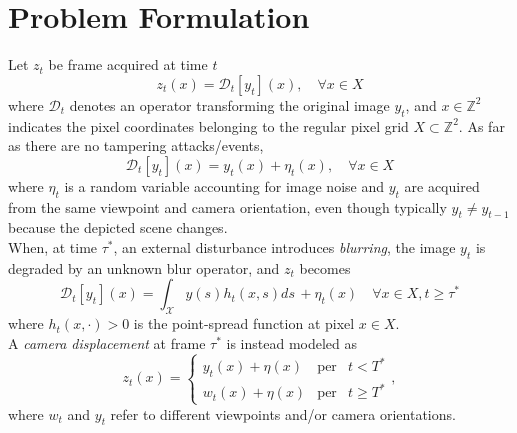 \documentclass{llncs}
\begin{document}

% 
%
%
%
\section{Problem Formulation}\label{sec:probForm}
%
Let $z_t$ be frame acquired at time $t$
\begin{equation}
\label{eq:observationModel}
z_t(x)=\mathcal{D}_t[y_t](x), \quad \forall x \in X
\end{equation}
where $\mathcal{D}_t$ denotes an operator transforming the original image $y_t$, and $x\in \mathbb{Z}^2$ indicates the pixel coordinates belonging to the regular pixel grid $X \subset \mathbb{Z}^2$. As far as there are no tampering attacks/events,
\begin{equation}
\label{eq:no_tampering}
\mathcal{D}_t[y_t](x) = y_t(x) + \eta_t(x), \quad \forall x \in X
\end{equation}
where $\eta_t$ is a random variable accounting for image noise and $y_t$ are acquired from the same viewpoint and camera orientation, even though typically $y_t \neq y_{t-1}$ because the depicted scene changes.\\
When, at time $\tau^*$, an external disturbance introduces \emph{blurring}, the image $y_t$ is degraded by an unknown blur operator, and $z_t$ becomes
\begin{equation}
\label{eq:model_defocus}
\mathcal{D}_t[y_t](x) = \int_{\mathcal{X}}y(s)h_t(x,s)ds\, + \eta_t(x) \quad \forall x \in X, t \geq \tau^*
\end{equation}
where $h_t(x,\cdot) > 0$ is the point-spread function at pixel $x \in X$.\\
A \emph{camera displacement} at frame $\tau^*$ is instead modeled as 
\begin{equation}
\label{eq:model_displacement}
z_t(x)  = \left\{ \begin{array}{rcl}
y_t(x) + \eta(x) & \mbox{per} & t < T^* \\
w_t(x) + \eta(x) & \mbox{per} & t \geqslant T^*
\end{array}\right. ,
\end{equation}
where $w_t$ and $y_t$ refer to different viewpoints and/or camera orientations.
\end{document}
